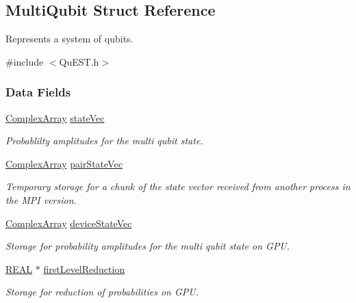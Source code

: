 \hypertarget{structMultiQubit}{}\subsection{Multi\+Qubit Struct Reference}
\label{structMultiQubit}


Represents a system of qubits.  




{\ttfamily \#include $<$Qu\+E\+S\+T.\+h$>$}

\subsubsection*{Data Fields}
\begin{DoxyCompactItemize}
\item 
\mbox{\hyperlink{structComplexArray}{Complex\+Array}} \mbox{\hyperlink{structMultiQubit_a45483190d6b01ef6b2f98f2bec9ab94f}{state\+Vec}}
\begin{DoxyCompactList}\small\item\em Probablilty amplitudes for the multi qubit state. \end{DoxyCompactList}\item 
\mbox{\hyperlink{structComplexArray}{Complex\+Array}} \mbox{\hyperlink{structMultiQubit_a76f7db4eab52d2b30f58f973ada809c5}{pair\+State\+Vec}}
\begin{DoxyCompactList}\small\item\em Temporary storage for a chunk of the state vector received from another process in the M\+PI version. \end{DoxyCompactList}\item 
\mbox{\hyperlink{structComplexArray}{Complex\+Array}} \mbox{\hyperlink{structMultiQubit_a59ac613486a41b8c9a4b6e79cc8d2cc3}{device\+State\+Vec}}
\begin{DoxyCompactList}\small\item\em Storage for probability amplitudes for the multi qubit state on G\+PU. \end{DoxyCompactList}\item 
\mbox{\hyperlink{QuEST__precision_8h_a4b654506f18b8bfd61ad2a29a7e38c25}{R\+E\+AL}} $\ast$ \mbox{\hyperlink{structMultiQubit_a4e0088b41adab0a40b7a31e528ed42b5}{first\+Level\+Reduction}}
\begin{DoxyCompactList}\small\item\em Storage for reduction of probabilities on G\+PU. \end{DoxyCompactList}\item 

\end{DoxyCompactItemize}
